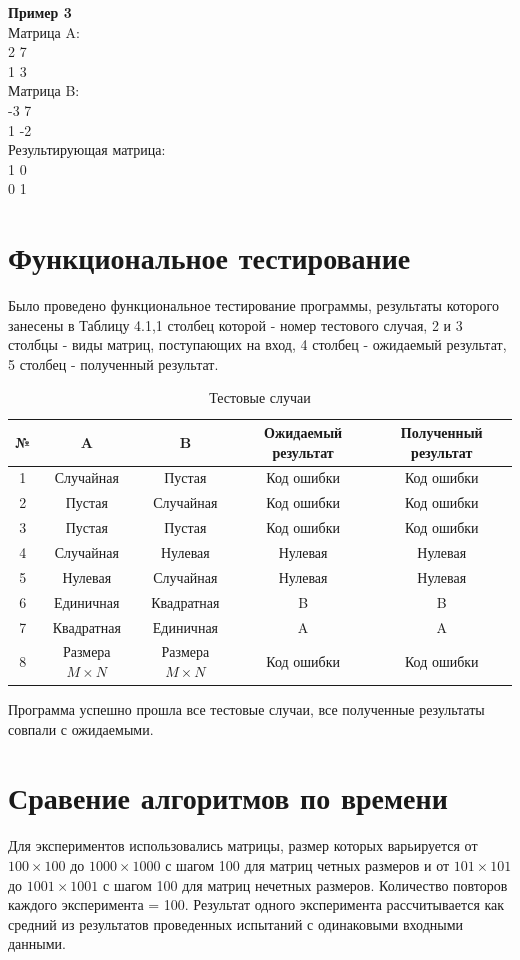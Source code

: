 \documentclass[a4paper,12pt]{report}
\begin{document}
\newpage 
\textbf {Пример 3}\\
Матрица A:\\
2 7\\
1 3\\
Матрица B:\\
-3 7\\
1 -2\\
Результирующая матрица:\\
1 0\\
0 1\\

\section{Функциональное тестирование}
\hspace{0.6cm}Было проведено функциональное тестирование программы, результаты которого занесены в Таблицу 4.1,1 столбец которой - номер тестового случая, 2 и 3 столбцы - виды матриц, поступающих на вход, 4 столбец - ожидаемый результат, 5 столбец - полученный результат. \\

\begin{table}[h!]
\begin{center}
\begin{tabular}{| c | c | c | c | c |}
\hline
№ & A & B & Ожидаемый результат & Полученный результат \\
\hline
1 & Случайная & Пустая & Код ошибки &  Код ошибки\\
\hline
2 & Пустая & Случайная &  Код ошибки &  Код ошибки\\
\hline
3 & Пустая & Пустая &  Код ошибки &  Код ошибки\\
\hline
4 & Случайная & Нулевая & Нулевая & Нулевая\\
\hline
5 & Нулевая & Случайная & Нулевая  & Нулевая \\
\hline
6 & Единичная & Квадратная & B & B\\
\hline
7 & Квадратная & Единичная & A & A\\
\hline
8 & Размера $M \times N$ & Размера $M \times N$ &  Код ошибки &  Код ошибки\\
\hline
\end{tabular}
\caption{Тестовые случаи}
\end{center}
\end{table}

Программа успешно прошла все тестовые случаи, все полученные результаты совпали с ожидаемыми.

\section{Сравение алгоритмов по времени}
\hspace{0.6cm}Для экспериментов использовались матрицы, размер которых варьируется от $100 \times 100$ до $1000 \times 1000$ с шагом 100 для матриц четных размеров и от $101 \times 101$ до $1001 \times 1001$ с шагом 100 для матриц нечетных размеров. 
    Количество повторов каждого эксперимента = 100. Результат одного эксперимента рассчитывается как средний из результатов проведенных испытаний с одинаковыми входными данными.
    
\end{document}
